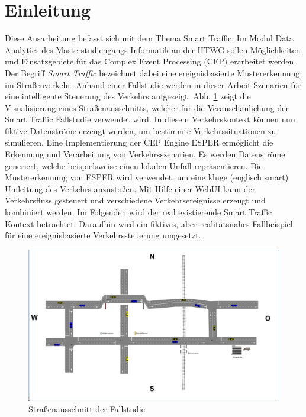 \section{Einleitung}

Diese Ausarbeitung befasst sich mit dem Thema Smart Traffic. Im Modul Data Analytics des Masterstudiengangs Informatik an der HTWG sollen Möglichkeiten und Einsatzgebiete für das Complex Event Processing (CEP)  erarbeitet werden. Der Begriff \emph{Smart Traffic} bezeichnet dabei eine ereignisbasierte Mustererkennung im Straßenverkehr. Anhand einer Fallstudie werden in dieser Arbeit Szenarien für eine intelligente Steuerung des Verkehrs aufgezeigt. Abb. \ref{fig1} zeigt die Visualisierung  eines Straßenausschnitts, welcher für die Veranschaulichung der Smart Traffic Fallstudie verwendet wird. In diesem Verkehrskontext können nun fiktive Datenströme erzeugt werden, um bestimmte Verkehrssituationen zu simulieren. Eine Implementierung der CEP Engine ESPER ermöglicht die Erkennung und Verarbeitung von Verkehrsszenarien. Es werden Datenströme generiert, welche beispielsweise einen lokalen Unfall  repräsentieren. Die Mustererkennung von ESPER wird verwendet, um eine kluge (englisch smart) Umleitung des Verkehrs anzustoßen. Mit Hilfe einer WebUI kann der Verkehrsfluss gesteuert und verschiedene Verkehrsereignisse erzeugt und kombiniert werden. Im Folgenden wird der real existierende Smart Traffic Kontext betrachtet. Daraufhin wird ein fiktives, aber realitätsnahes Fallbeispiel für eine ereignisbasierte Verkehrssteuerung umgesetzt. 


\begin{figure}[ht]
	\includegraphics[width=\textwidth]{images/1_InitialStreetMap_Final.png}
	\caption{Straßenausschnitt der Fallstudie}
	\label{fig1}
\end{figure}




